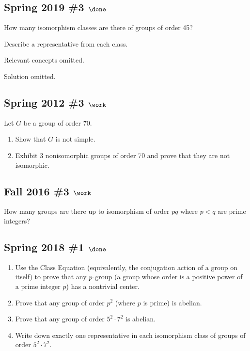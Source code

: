 
\hypertarget{spring-2019-3-done}{%
\subsection{\texorpdfstring{Spring 2019 \#3
\(\done\)}{Spring 2019 \#3 \textbackslash done}}\label{spring-2019-3-done}}

How many isomorphism classes are there of groups of order 45?

Describe a representative from each class.

Relevant concepts omitted.

Solution omitted.


\hypertarget{spring-2012-3-work}{%
\subsection{\texorpdfstring{Spring 2012 \#3
\(\work\)}{Spring 2012 \#3 \textbackslash work}}\label{spring-2012-3-work}}

Let \(G\) be a group of order 70.

\begin{enumerate}
\def\labelenumi{\alph{enumi}.}
\item
  Show that \(G\) is not simple.
\item
  Exhibit 3 nonisomorphic groups of order 70 and prove that they are not
  isomorphic.
\end{enumerate}

\hypertarget{fall-2016-3-work}{%
\subsection{\texorpdfstring{Fall 2016 \#3
\(\work\)}{Fall 2016 \#3 \textbackslash work}}\label{fall-2016-3-work}}

How many groups are there up to isomorphism of order \(pq\) where
\(p<q\) are prime integers?

\hypertarget{spring-2018-1-done}{%
\subsection{\texorpdfstring{Spring 2018 \#1
\(\done\)}{Spring 2018 \#1 \textbackslash done}}\label{spring-2018-1-done}}

\begin{enumerate}
\def\labelenumi{\alph{enumi}.}
\item
  Use the Class Equation (equivalently, the conjugation action of a
  group on itself) to prove that any \(p{\hbox{-}}\)group (a group whose
  order is a positive power of a prime integer \(p\)) has a nontrivial
  center.
\item
  Prove that any group of order \(p^2\) (where \(p\) is prime) is
  abelian.
\item
  Prove that any group of order \(5^2 \cdot 7^2\) is abelian.
\item
  Write down exactly one representative in each isomorphism class of
  groups of order \(5^2 \cdot 7^2\).
\end{enumerate}

